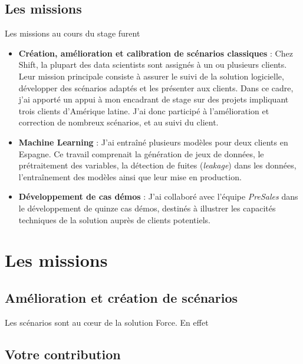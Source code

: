 \documentclass [twoside,openright,a4paper,11pt,french] {report}
\begin{document}
\section {Les missions}

Les missions au cours du stage furent

\begin{itemize}
    \item \textbf{Création, amélioration et calibration de scénarios classiques} : Chez Shift, la plupart
     des data scientists sont assignés à un ou plusieurs clients. Leur mission principale consiste à assurer
      le suivi de la solution logicielle, développer des scénarios adaptés et les présenter aux clients.
       Dans ce cadre, j’ai apporté un appui à mon encadrant de stage sur des projets impliquant trois clients d’Amérique latine.
       J'ai donc participé à l'amélioration et correction de nombreux scénarios, et au suivi du client.
    
    \item \textbf{Machine Learning} : J’ai entraîné plusieurs modèles pour deux clients en Espagne. Ce travail comprenait 
    la génération de jeux de données, le prétraitement des variables, 
    la détection de fuites (\textit{leakage}) dans les données, l’entraînement des modèles ainsi que leur mise en production.
    
    \item \textbf{Développement de cas démos} : J’ai collaboré avec l’équipe \textit{PreSales} dans le développement
     de quinze cas démos, destinés à illustrer les capacités techniques de la solution auprès de clients potentiels.
\end{itemize}



\chapter{Les missions}

\section{Amélioration et création de scénarios}

Les scénarios sont au cœur de la solution Force. En effet

\section {Votre contribution}
\end{document}
